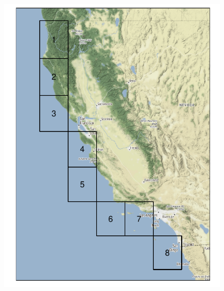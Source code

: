 \begin{figure}[tb]
    \centering
    \begin{minipage}{0.25\textwidth}
    \centering
    \includegraphics[width=0.99\linewidth]{./images/erai_grid}
    \end{minipage}%
    \begin{minipage}{0.25\textwidth}
    \centering

\end{minipage}
\end{figure}
